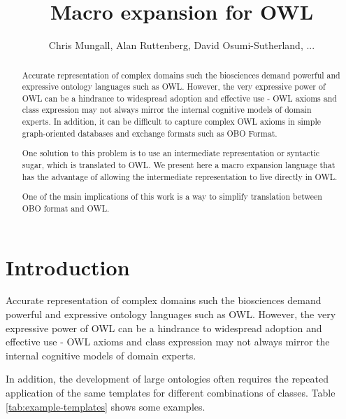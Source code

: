 \documentclass[11pt]{article}
\title{Macro expansion for OWL}
\author{Chris Mungall, Alan Ruttenberg, David Osumi-Sutherland, ...}
\begin{document}
\maketitle

\begin{abstract}

Accurate representation of complex domains such the biosciences demand
powerful and expressive ontology languages such as OWL. However, the
very expressive power of OWL can be a hindrance to widespread adoption
and effective use - OWL axioms and class expression may not always
mirror the internal cognitive models of domain experts. In addition,
it can be difficult to capture complex OWL axioms in simple
graph-oriented databases and exchange formats such as OBO Format.

One solution to this problem is to use an intermediate representation
or syntactic sugar, which is translated to OWL. We present here a
macro expansion language that has the advantage of allowing the
intermediate representation to live directly in OWL.

One of the main implications of this work is a way to simplify
translation between OBO format and OWL. 

\end{abstract}

\section{Introduction}


Accurate representation of complex domains such the biosciences demand
powerful and expressive ontology languages such as OWL. However, the
very expressive power of OWL can be a hindrance to widespread adoption
and effective use - OWL axioms and class expression may not always
mirror the internal cognitive models of domain experts. 

In addition, the development of large ontologies often requires the
repeated application of the same templates for different combinations
of classes. Table \ref{tab:example-templates} shows some examples.
\end{document}
